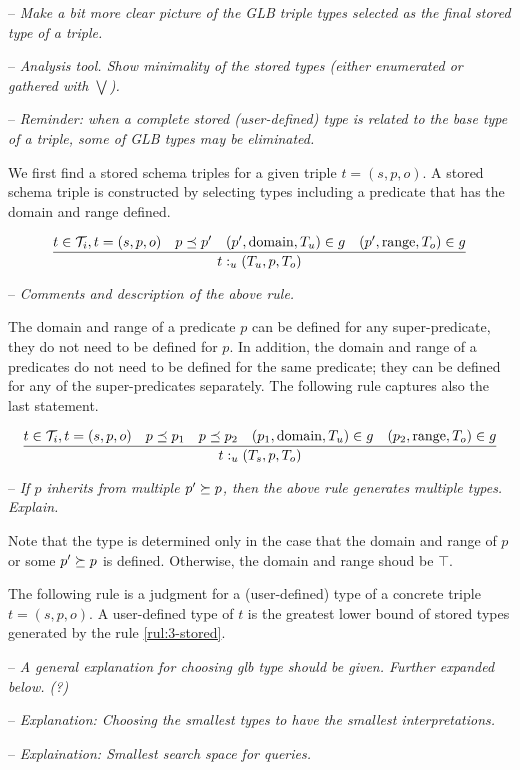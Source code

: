 \documentclass[runningheads]{llncs}
\newcommand{\Ti}{{\cal T}_i}
\newcommand{\notes}[1]{\noindent\begin{small}-- \emph{#1}\\\end{small}}
\begin{document}
\notes{Make a bit more clear picture of the GLB triple types selected as the final stored type of a triple.}
\notes{Analysis tool. Show minimality of the stored types (either enumerated or gathered with $\bigvee$).}
\notes{\emph{Reminder:} when a complete stored (user-defined) type is related to the base type of a triple, some of GLB types may be eliminated.}

We first find a stored schema triples for a given triple $t=(s,p,o)$. A
stored schema triple is constructed by selecting types including a
predicate that has the domain and range defined.

\begin{equation}
\label{rul:3-stored}
\dfrac{t\in\Ti,t=(s,p,o)\quad p\preceq\/p'\quad (p',\text{domain},T_u)\in\/g\quad (p',\text{range},T_o)\in\/g}
      {t:_u(T_u,p,T_o)}
\end{equation}


\medskip
\notes{Comments and description of the above rule.}

The domain and range of a predicate $p$ can be defined for any
super-predicate, they do not need to be defined for $p$. In addition,
the domain and range of a predicates do not need to be defined for the
same predicate; they can be defined for any of the super-predicates
separately. The following rule captures also the last statement.

\begin{equation}
\label{rul:3-stored1}
\dfrac{t\in\Ti, t=(s,p,o)\quad p\preceq\/p_1\quad p\preceq\/p_2\quad (p_1,\text{domain},T_u)\in\/g
                \quad (p_2,\text{range},T_o)\in\/g}
      {t:_u(T_s,p,T_o)}
\end{equation}

\notes{If $p$ inherits from multiple $p'\succeq\/p$, then the above rule generates multiple types. Explain.}

Note that the type is determined only in the case that the domain and
range of $p$ or some $p'\succeq\/p$ is defined. Otherwise, the domain
and range shoud be $\top$.

The following rule is a judgment for a (user-defined) type of a
concrete triple $t=(s,p,o)$. A user-defined type of $t$ is the
greatest lower bound of stored types generated by the rule
\ref{rul:3-stored}.

\notes{A general explanation for choosing glb type should be given. Further expanded below. (?)}
\notes{Explanation: Choosing the smallest types to have the smallest interpretations.}
\notes{Explaination: Smallest search space for queries.} 
\end{document}
